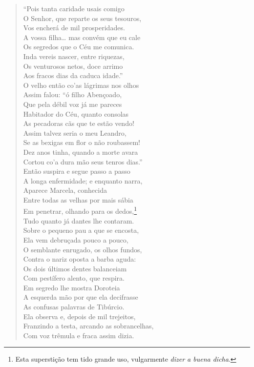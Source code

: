 \begin{verse}
``Pois tanta caridade usais comigo\\
O Senhor, que reparte os seus tesouros,\\ 
Vos encherá de mil prosperidades.\\
A vossa filha\ldots{} mas convém que eu cale\\
Os segredos que o Céu me comunica.\\
Inda vereis nascer, entre riquezas,\\
Os venturosos netos, doce arrimo\\
Aos fracos dias da caduca idade.''\\
O velho então co'as lágrimas nos olhos\\
Assim falou: ``ó filho Abençoado,\\
Que pela débil voz já me pareces\\
Habitador do Céu, quanto consolas\\
As pecadoras cãs que te estão vendo!\\
Assim talvez seria o meu Leandro,\\
Se as bexigas em flor o não roubassem!\\	\index{\Bexig}
Dez anos tinha, quando a morte avara\\
Cortou co'a dura mão seus tenros dias.''\\
Então suspira e segue passo a passo\\
A longa enfermidade; e enquanto narra,\\
Aparece Marcela, conhecida\\
Entre todas as velhas por mais sábia\\
Em penetrar, olhando para os dedos,\footnote{ Esta superstição tem tido
grande uso, vulgarmente \textit{dizer a buena dicha}.}\\
Tudo quanto já dantes lhe contaram.\\
Sobre o pequeno pau a que se encosta,\\
Ela vem debruçada pouco a pouco,\\
O semblante enrugado, os olhos fundos,\\
Contra o nariz oposta a barba aguda:\\
Os dois últimos dentes balanceiam\\
Com pestífero alento, que respira.\\
Em segredo lhe mostra Doroteia\\
A esquerda mão por que ela decifrasse\\
As confusas palavras de Tibúrcio.\\
Ela observa e, depois de mil trejeitos,\\
Franzindo a testa, arcando as sobrancelhas,\\
Com voz trêmula e fraca assim dizia. \\[10pt]



\end{verse}
